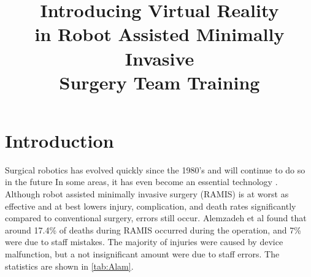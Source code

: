 \documentclass[conference]{IEEEtran}
\begin{document}
\title{Introducing Virtual Reality \\ in Robot Assisted Minimally Invasive \\ Surgery Team Training}


\author{
}
\maketitle
\thispagestyle{fancy}

\begin{abstract}


\end{abstract}





%
\IEEEpeerreviewmaketitle



\section{Introduction}

Surgical robotics has evolved quickly since the 1980's and will continue to do so in the future\citep{taylor_medical_2008} In some areas, it has even become an essential technology \citep{sivaraman_robotics_2015}. Although robot assisted minimally invasive surgery (RAMIS) is at worst as effective and at best lowers injury, complication, and death rates significantly compared to conventional surgery, errors still occur\citep{razmaria_does_2014, punnen_how_2013, sung_oncologic_2016,raza_long-term_2015}. Alemzadeh et al found that around 17.4\% of deaths during RAMIS occurred during the operation, and 7\% were due to staff mistakes. The majority of injuries were caused by device malfunction, but a not insignificant amount were due to staff errors. The statistics are shown in \autoref{tab:Alam}\citep{alemzadeh_adverse_2016}.
\end{document}
